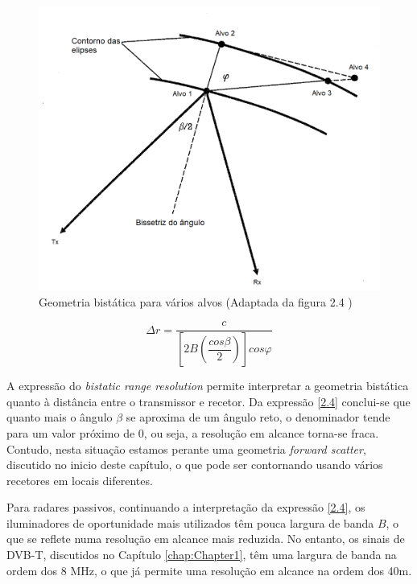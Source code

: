 \begin{figure}[h]
\centering
\includegraphics[scale=0.5]{chapters/ch2/assets/geom_varios_alvos}
\caption[Geometria bistática para vários alvos]{Geometria bistática para vários alvos (Adaptada da figura 2.4 \cite{Griffiths2017})}
\label{fig:geom_varios_alvos}
\end{figure}


\begin{equation} \label{2.4}
\Delta r=\dfrac{c}{\left[ 2B\left( \dfrac{cos\beta}{2}\right)\right] cos\varphi}
\end{equation}


A expressão do \textit{bistatic range resolution} permite interpretar a geometria bistática quanto à distância entre o transmissor e recetor. Da expressão \ref{2.4} conclui-se que quanto mais o ângulo $\beta$ se aproxima de um ângulo reto, o denominador tende para um valor próximo de 0, ou seja, a resolução em alcance torna-se fraca. Contudo, nesta situação estamos perante uma geometria \textit{forward scatter}, discutido no inicio deste capítulo, o que pode ser contornando usando vários recetores em locais diferentes.\par 
Para radares passivos, continuando a interpretação da expressão \ref{2.4}, os iluminadores de oportunidade mais utilizados têm pouca largura de banda $B$, o que se reflete numa resolução em alcance mais reduzida. No entanto, os sinais de DVB-T, discutidos no Capítulo \ref{chap:Chapter1}, têm uma largura de banda na ordem dos 8 MHz, o que já permite uma resolução em alcance na ordem dos 40m.

